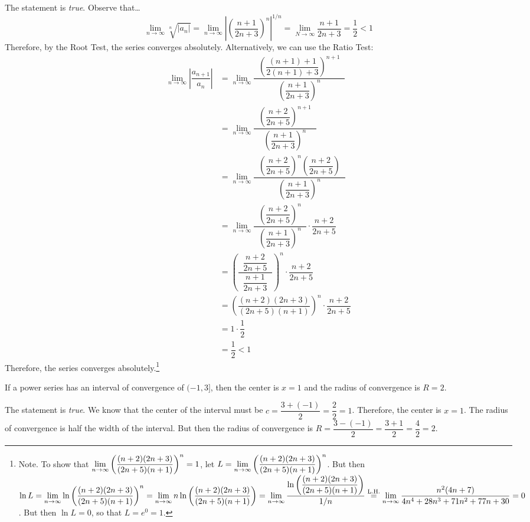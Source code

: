 \documentclass[11pt,letterpaper]{article}
\begin{document}
\sol The statement is \textit{true}. Observe that\dots
	\[
	\lim_{n \to \infty} \sqrt[n]{|a_n|}= \lim_{n \to \infty} \left| \left( \dfrac{n + 1}{2n + 3} \right)^n \right|^{1/n}= \lim_{N \to \infty} \dfrac{n + 1}{2n + 3}= \dfrac{1}{2} < 1
	\]
Therefore, by the Root Test, the series converges absolutely. Alternatively, we can use the Ratio Test:
	\[
	\begin{aligned}
	\lim_{n \to \infty} \left| \dfrac{a_{n+1}}{a_n} \right|&= \lim_{n \to \infty} \dfrac{\;\;\left( \dfrac{(n +1) + 1}{2(n + 1)+ 3} \right)^{n+1}\;\;}{\left( \dfrac{n + 1}{2n + 3} \right)^n} \\
	&= \lim_{n \to \infty} \dfrac{\;\;\left( \dfrac{n + 2}{2n + 5} \right)^{n+1}\;\;}{\left( \dfrac{n + 1}{2n + 3} \right)^n} \\\
	&= \lim_{n \to \infty} \dfrac{\;\;\left( \dfrac{n + 2}{2n + 5} \right)^n \left( \dfrac{n + 2}{2n + 5} \right)\;\;}{\left( \dfrac{n + 1}{2n + 3} \right)^n} \\
	&= \lim_{n \to \infty} \dfrac{\;\;\left( \dfrac{n + 2}{2n + 5} \right)^n\;\;}{\left( \dfrac{n + 1}{2n + 3} \right)^n} \cdot  \dfrac{n + 2}{2n + 5} \\
	&= \left( \dfrac{\;\;\dfrac{n + 2}{2n + 5}\;\;}{\dfrac{n + 1}{2n + 3}} \right)^n \cdot \dfrac{n + 2}{2n + 5} \\
	&= \left( \dfrac{(n + 2)(2n + 3)}{(2n + 5)(n + 1)} \right)^n \cdot \dfrac{n + 2}{2n + 5} \\
	&= 1 \cdot \dfrac{1}{2} \\
	&= \dfrac{1}{2} < 1
	\end{aligned}
	\]
Therefore, the series converges absolutely.\footnote{\tiny Note. To show that $\displaystyle\lim_{n \to \infty} \left( \dfrac{(n + 2)(2n + 3)}{(2n + 5)(n + 1)} \right)^n= 1$, let $\displaystyle L= \lim_{n \to \infty} \left( \dfrac{(n + 2)(2n + 3)}{(2n + 5)(n + 1)} \right)^n$. But then $\displaystyle \ln L= \lim_{n \to \infty} \ln \left( \dfrac{(n + 2)(2n + 3)}{(2n + 5)(n + 1)} \right)^n= \lim_{n \to \infty} n \ln \left( \dfrac{(n + 2)(2n + 3)}{(2n + 5)(n + 1)} \right)= \lim_{n \to \infty} \dfrac{\ln \left( \dfrac{(n + 2)(2n + 3)}{(2n + 5)(n + 1)} \right)}{1/n} \stackrel{\text{L.H.}}{=} \lim_{n \to \infty} \dfrac{n^2(4n + 7)}{4n^4 + 28n^3 + 71n^2 + 77n + 30}= 0$. But then $\ln L= 0$, so that $L= e^0= 1$.} \pvspace{1.3cm}



 If a power series has an interval of convergence of $(-1, 3]$, then the center is $x= 1$ and the radius of convergence is $R= 2$. \pspace

\sol The statement is \textit{true}. We know that the center of the interval must be $c= \dfrac{3 + (-1)}{2}= \dfrac{2}{2}= 1$. Therefore, the center is $x= 1$. The radius of convergence is half the width of the interval. But then the radius of convergence is $R= \dfrac{3 - (-1)}{2}= \dfrac{3 + 1}{2}= \dfrac{4}{2}= 2$. \pvspace{1.3cm}
\end{document}
